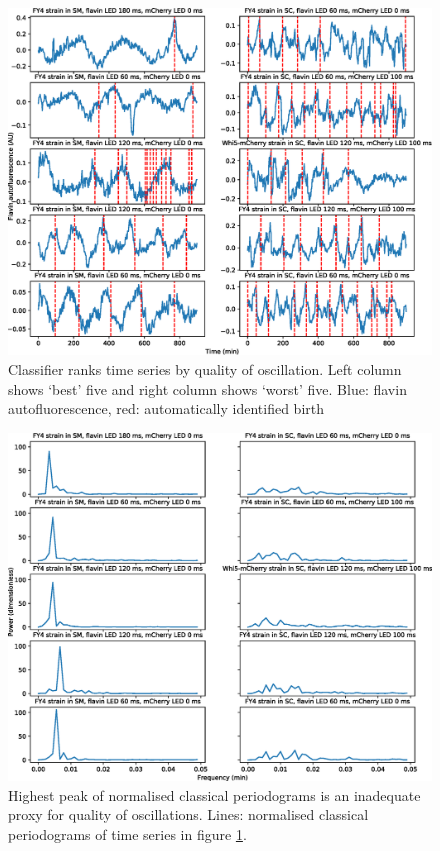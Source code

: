 \begin{figure}[htbp]
  \centering
  \includegraphics[width=\textwidth]{10m_ClassifierBestWorstTS}
  \caption{Classifier ranks time series by quality of oscillation.
    Left column shows `best' five and right column shows `worst' five.
    Blue: flavin autofluorescence, red: automatically identified birth}
  \label{fig:ClassifierBestWorstTS}
\end{figure}

\begin{figure}[htbp]
  \centering
  \includegraphics[width=\textwidth]{10m_ClassifierBestWorstPS}
  \caption{Highest peak of normalised classical periodograms is an inadequate proxy for quality of oscillations.
    Lines: normalised classical periodograms of time series in figure \ref{fig:ClassifierBestWorstTS}.}
  \label{fig:ClassifierBestWorstPS}
\end{figure}

